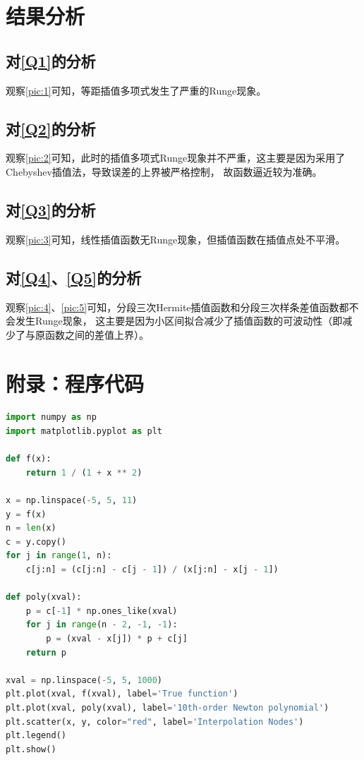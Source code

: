 \documentclass[a4paper,11pt,notitlepage]{article}
\begin{document}
\section{结果分析}
\subsection{对\ref{Q1}的分析}
观察\cref{pic:1}可知，等距插值多项式发生了严重的Runge现象。

\subsection{对\ref{Q2}的分析}
观察\cref{pic:2}可知，此时的插值多项式Runge现象并不严重，这主要是因为采用了Chebyshev插值法，导致误差的上界被严格控制，
故函数逼近较为准确。

\subsection{对\ref{Q3}的分析}
观察\cref{pic:3}可知，线性插值函数无Runge现象，但插值函数在插值点处不平滑。

\subsection{对\ref{Q4}、\ref{Q5}的分析}
观察\cref{pic:4}、\cref{pic:5}可知，分段三次Hermite插值函数和分段三次样条差值函数都不会发生Runge现象，
这主要是因为小区间拟合减少了插值函数的可波动性（即减少了与原函数之间的差值上界）。

\section{附录：程序代码}
\begin{lstlisting}[language=Python,caption={Fourth Week 1A.py},label={code1.1}]
import numpy as np
import matplotlib.pyplot as plt

def f(x):
    return 1 / (1 + x ** 2)

x = np.linspace(-5, 5, 11)
y = f(x)
n = len(x)
c = y.copy()
for j in range(1, n):
    c[j:n] = (c[j:n] - c[j - 1]) / (x[j:n] - x[j - 1])

def poly(xval):
    p = c[-1] * np.ones_like(xval)
    for j in range(n - 2, -1, -1):
        p = (xval - x[j]) * p + c[j]
    return p

xval = np.linspace(-5, 5, 1000)
plt.plot(xval, f(xval), label='True function')
plt.plot(xval, poly(xval), label='10th-order Newton polynomial')
plt.scatter(x, y, color="red", label='Interpolation Nodes')
plt.legend()
plt.show()
\end{lstlisting}
\end{document}
